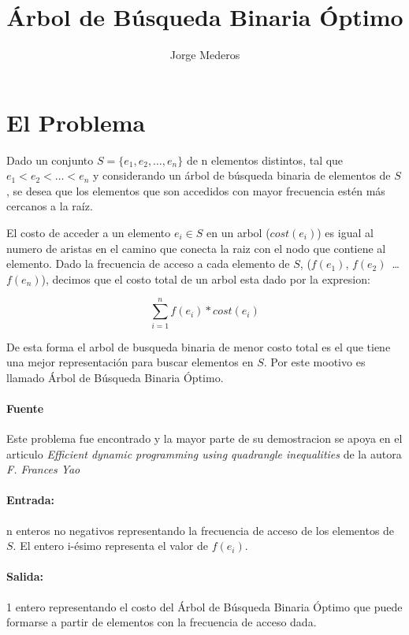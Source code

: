 \documentclass[spanish]{llncs}
\begin{document}
\title{Árbol de Búsqueda Binaria Óptimo}

\author{Jorge Mederos}


\maketitle

\section{El Problema}

Dado un conjunto $S = \{e_1, e_2, \dots, e_n\}$ de n elementos distintos,
tal que $e_1 < e_2 < \dots < e_n$ y considerando un árbol de búsqueda binaria
de elementos de $S$, se desea que los elementos que son accedidos con mayor
frecuencia estén más cercanos a la raíz.

El costo de acceder a un elemento $e_i \in S$ en un arbol ($cost(e_i)$) es igual
al numero de aristas en el camino que conecta la raiz con el nodo que contiene
al elemento. Dado la frecuencia de acceso a cada elemento de $S$, ($f(e_1)$, $f(e_2)$~\dots
$f(e_n)$), decimos que el costo total de un arbol esta dado por la expresion: 

$$\sum_{i=1}^{n} f(e_i)*cost(e_i)$$

De esta forma el arbol de busqueda binaria de menor costo total es el que tiene una mejor
representación para buscar elementos en $S$. Por este mootivo es llamado Árbol de Búsqueda
Binaria Óptimo.

\paragraph*{Fuente}Este problema fue encontrado y la mayor parte de su demostracion se apoya en
el articulo \emph{Efficient dynamic programming using quadrangle inequalities} de la autora \emph{F. Frances Yao}

\paragraph{Entrada:} n enteros no negativos representando la frecuencia de acceso de los
elementos de $S$. El entero i-ésimo representa el valor de $f(e_i)$.

\paragraph{Salida:} 1 entero representando el costo del Árbol de Búsqueda Binaria
Óptimo que puede formarse a partir de elementos con la frecuencia de acceso dada.
\end{document}
